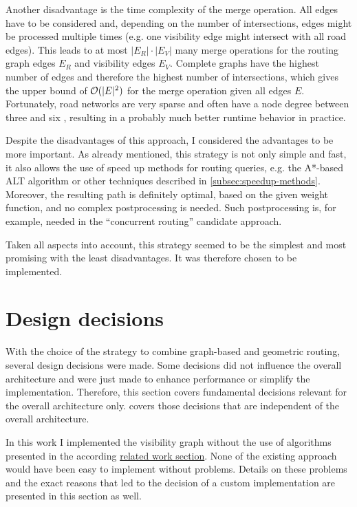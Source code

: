 		Another disadvantage is the time complexity of the merge operation.
		All edges have to be considered and, depending on the number of intersections, edges might be processed multiple times (e.g. one visibility edge might intersect with all road edges).
		This leads to at most $|E_R| \cdot |E_V|$ many merge operations for the routing graph edges $E_R$ and visibility edges $E_V$.
		Complete graphs have the highest number of edges and therefore the highest number of intersections, which gives the upper bound of $\mathcal{O}(|E|^2)$ for the merge operation given all edges $E$.
		Fortunately, road networks are very sparse and often have a node degree between three and six \cite{zhao-analysis-osm-bejing}\cite{boeing-osmnx}, resulting in a probably much better runtime behavior in practice.
		
		Despite the disadvantages of this approach, I considered the advantages to be more important.
		As already mentioned, this strategy is not only simple and fast, it also allows the use of speed up methods for routing queries, e.g. the A*-based ALT algorithm or other techniques described in \cref{subsec:speedup-methods}.
		Moreover, the resulting path is definitely optimal, based on the given weight function, and no complex postprocessing is needed.
		Such postprocessing is, for example, needed in the \enquote{concurrent routing} candidate approach.
		
		Taken all aspects into account, this strategy seemed to be the simplest and most promising with the least disadvantages.
		It was therefore chosen to be implemented.

\section{Design decisions}
\label{sec:design-decisions}

	With the choice of the strategy to combine graph-based and geometric routing, several design decisions were made.
	Some decisions did not influence the overall architecture and were just made to enhance performance or simplify the implementation.
	Therefore, this section covers fundamental decisions relevant for the overall architecture only.
	 covers those decisions that are independent of the overall architecture.
	
	In this work I implemented the visibility graph without the use of algorithms presented in the according \hyperref[subsec:related-work:visibility-graph]{related work section}.
	None of the existing approach would have been easy to implement without problems.
	Details on these problems and the exact reasons that led to the decision of a custom implementation are presented in this section as well.
	
